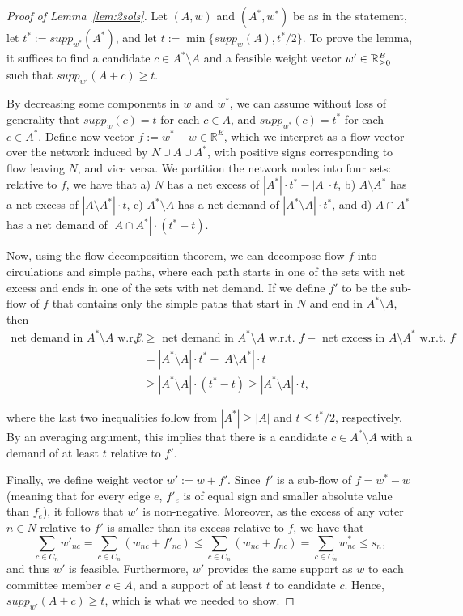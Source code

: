 \begin{proof}[Proof of Lemma~\ref{lem:2sols}]
Let $(A,w)$ and $(A^*, w^*)$ be as in the statement, let $t^*:=supp_{w^*}(A^*)$, and let $t:=\min\{supp_w(A), t^*/2\}$. To prove the lemma, it suffices to find a candidate $c\in A^*\setminus A$ and a feasible weight vector $w'\in\mathbb{R}_{\geq 0}^E$ such that $supp_{w'}(A+c)\geq t$.

By decreasing some components in $w$ and $w^*$, we can assume without loss of generality that $supp_w(c)=t$ for each $c\in A$, and $supp_{w^*}(c)=t^*$ for each $c\in A^*$. Define now vector $f:=w^* - w\in\mathbb{R}^E$, which we interpret as a flow vector over the network induced by $N\cup A\cup A^*$, with positive signs corresponding to flow leaving $N$, and vice versa. We partition the network nodes into four sets: relative to $f$, we have that a) $N$ has a net excess of $|A^*|\cdot t^* - |A|\cdot t$, b) $A\setminus A^*$ has a net excess of $|A\setminus A^*|\cdot t$, c) $A^*\setminus A$ has a net demand of $|A^*\setminus A|\cdot t^*$, and d) $A\cap A^*$ has a net demand of $|A\cap A^*|\cdot (t^*-t)$.

Now, using the flow decomposition theorem, we can decompose flow $f$ into circulations and simple paths, where each path starts in one of the sets with net excess and ends in one of the sets with net demand. If we define $f'$ to be the sub-flow of $f$ that contains only the simple paths that start in $N$ and end in $A^*\setminus A$, then %
%
\begin{align*}
    \text{net demand in $A^*\setminus A$ w.r.t. } f' &\geq \text{ net demand in $A^*\setminus A$ w.r.t. } f - \text{ net excess in $A\setminus A^*$ w.r.t. } f\\
    &= |A^*\setminus A|\cdot t^* - |A\setminus A^*|\cdot t\\
    &\geq |A^*\setminus A|\cdot (t^*-t) \geq |A^*\setminus A|\cdot t,
\end{align*}

where the last two inequalities follow from $|A^*|\geq |A|$ and $t\leq t^*/2$, respectively. By an averaging argument, this implies that there is a candidate $c\in A^*\setminus A$ with a demand of at least $t$ relative to $f'$.

Finally, we define weight vector $w':=w+f'$. Since $f'$ is a sub-flow of $f=w^* - w$ (meaning that for every edge $e$, $f'_e$ is of equal sign and smaller absolute value than $f_e$), it follows that $w'$ is non-negative. Moreover, as the excess of any voter $n\in N$ relative to $f'$ is smaller than its excess relative to $f$, we have that 
$$\sum_{c\in C_n} {w'}_{nc}=\sum_{c\in C_n} (w_{nc} + f'_{nc}) \leq \sum_{c\in C_n} (w_{nc} + f_{nc})=\sum_{c\in C_n} w^*_{nc} \leq s_n,$$ 
and thus $w'$ is feasible. Furthermore, $w'$ provides the same support as $w$ to each committee member $c\in A$, and a support of at least $t$ to candidate $c$. Hence, $supp_{w'}(A+c)\geq t$, which is what we needed to show.
\end{proof}


